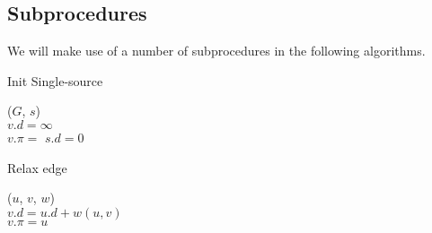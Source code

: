 \subsection{Subprocedures}
We will make use of a number of subprocedures in the following algorithms.
\begin{minipage}[t]{0.45\linewidth}
	\begin{algorithm}[H]
		\caption{Init Single-source}
		\label{alg:init-single-source}
		
		
		
		
		\BlankLine
		\InitSingleSource($G$, $s$) \\
		\Begin
		{
			{
				$v.d = \infty$ \\
				$v.\pi = $ \Nil
			}
			$s.d = 0$
		}
	\end{algorithm}
\end{minipage}
\hspace{0.5cm}
\begin{minipage}[t]{0.45\linewidth}
	\begin{algorithm}[H]
		\caption{Relax edge}
		\label{alg:relax}
		
		
		
		
		
		\BlankLine
		\Relax($u$, $v$, $w$) \\
		\Begin
		{
			{
				$v.d = u.d + w(u, v)$ \\
				$v.\pi = u$
			}
		}
	\end{algorithm}
\end{minipage}

\newpage
